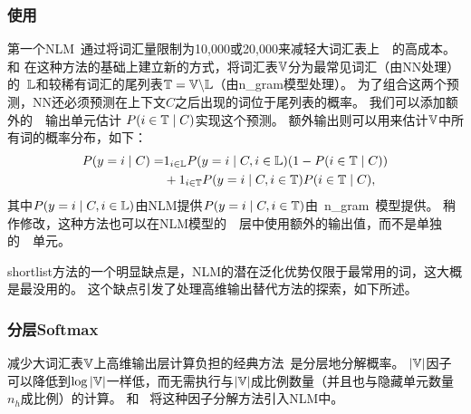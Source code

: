 \subsubsection{使用}
第一个\gls{NLM}~\citep{BenDucVin01-small,Bengio-nnlm2003-small}通过将词汇量限制为10,000或20,000来减轻大词汇表上~~的高成本。
\citet{Schwenk+Gauvain2002}和 \citet{Schwenk-2007}在这种方法的基础上建立新的方式，将词汇表$\mathbb{V}$分为最常见词汇（由\gls{NN}处理）的~$\mathbb{L}$和较稀有词汇的尾列表$\mathbb{T} = \mathbb{V} \backslash \mathbb{L}$（由\gls{n_gram}模型处理）。
为了组合这两个预测，\gls{NN}还必须预测在上下文$C$之后出现的词位于尾列表的概率。
我们可以添加额外的~~输出单元估计 $P(i \in \mathbb{T} \mid C)$实现这个预测。
额外输出则可以用来估计$\mathbb{V}$中所有词的概率分布，如下：
\begin{align}
 P(y=i\mid C)  =& 1_{i \in \mathbb{L}} P(y=i\mid C, i \in \mathbb{L}) (1 - P(i \in \mathbb{T}\mid C)) \nonumber \\
     & + 1_{i \in \mathbb{T}} P(y=i\mid C, i \in \mathbb{T}) P(i \in \mathbb{T}\mid C),
\end{align}
其中$P(y=i\mid C, i \in \mathbb{L})$由\gls{NLM}提供$P(y=i\mid C, i \in \mathbb{T})$由~\gls{n_gram}~模型提供。
稍作修改，这种方法也可以在\gls{NLM}模型的~~层中使用额外的输出值，而不是单独的~~单元。

\gls{shortlist}方法的一个明显缺点是，\gls{NLM}的潜在泛化优势仅限于最常用的词，这大概是最没用的。
这个缺点引发了处理高维输出替代方法的探索，如下所述。

\subsubsection{分层Softmax}
减少大词汇表$\mathbb{V}$上高维输出层计算负担的经典方法~\citep{Goodman2001}是分层地分解概率。
$|\mathbb{V}|$因子可以降低到$\log |\mathbb{V}|$一样低，而无需执行与$|\mathbb{V}|$成比例数量（并且也与隐藏单元数量$n_h$成比例）的计算。
\citet{BengioTR1215}和~\citet{Morin+Bengio-2005-small} 将这种因子分解方法引入\gls{NLM}中。


